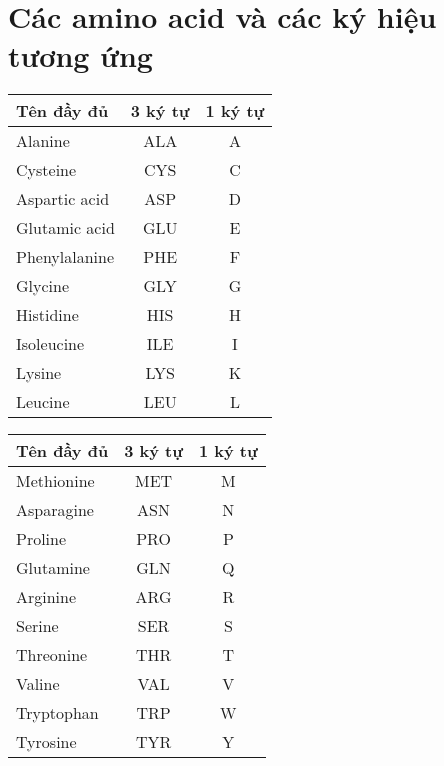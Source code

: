 \chapter{Các amino acid và các ký hiệu tương ứng}
\begin{multicols}{2}
\begin{tabular}{l|c c}
\hline
Tên đầy đủ & 3 ký tự & 1 ký tự \\
\hline
Alanine & ALA & A \\
Cysteine & CYS & C \\
Aspartic acid & ASP & D \\
Glutamic acid & GLU & E \\
Phenylalanine & PHE & F \\
Glycine & GLY & G \\
Histidine & HIS & H \\
Isoleucine & ILE & I \\
Lysine & LYS & K \\
Leucine & LEU & L \\
\end{tabular}

\begin{tabular}{l|c c}
\hline
Tên đầy đủ & 3 ký tự & 1 ký tự \\
\hline
Methionine & MET & M \\
Asparagine & ASN & N \\
Proline & PRO & P \\
Glutamine & GLN & Q \\
Arginine & ARG & R \\
Serine & SER & S \\
Threonine & THR & T \\
Valine & VAL & V \\
Tryptophan & TRP & W \\
Tyrosine & TYR & Y \\
\end{tabular}
\end{multicols}